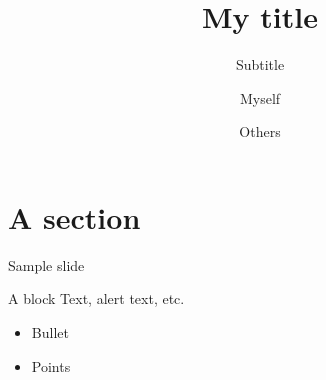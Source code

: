 \documentclass[aspectratio=169]{beamer}
\title{My title}
\subtitle{Subtitle}
\institute{University of Wisconsin--Madison}
\author{Myself \and Others}
\begin{document}
  {
    \begin{frame}[plain]
      \vskip4cm
      \titlepage
    \end{frame}
  }
  
  \section{A section} %

  \begin{frame}{Sample slide}
      \begin{block}{A block}
        Text, \alert{alert text}, etc.
      \end{block}
      \begin{itemize}
        \item Bullet
        \item Points
      \end{itemize}
  \end{frame}
\end{document}
